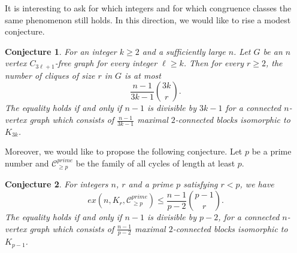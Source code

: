 \documentclass[a4paper,11pt]{article}
\newtheorem{conjecture}{Conjecture}
\def\C{\mathcal C}
\begin{document}
It is interesting to ask for which integers and for which congruence classes the same phenomenon still holds. 
In this direction, we would like to rise a modest conjecture.
\begin{conjecture}
    For an integer $k\geq 2$ and a sufficiently large $n$. Let $G$ be an $n$ vertex $C_{3\ell+1}$-free graph for every integer $\ell \geq k $. Then for every $r\geq 2$, the number of cliques of size $r$ in $G$ is at most
\[
 \frac{n-1}{3k-1}\binom{3k}{r}.
\]
The equality holds if and only if $n-1$ is divisible by $3k-1$ for a connected $n$-vertex graph which consists of $\frac{n-1}{3k-1}$ maximal $2$-connected blocks isomorphic to $K_{3k}$. 
\end{conjecture}
Moreover, we would like to propose the following conjecture. 
Let $p$ be a prime number and $\C_{\geq p}^{prime}$ be the family of all cycles of length at least $p$.
\begin{conjecture}
For integers $n$, $r$ and a prime $p$ satisfying $r<p$, we have  
\[
 ex(n,K_r,\C_{\geq p}^{prime})\leq \frac{n-1}{p-2}\binom{p-1}{r}.
\]
The equality holds if and only if $n-1$ is divisible by $p-2$, for a connected $n$-vertex graph which consists of $\frac{n-1}{p-2}$ maximal $2$-connected blocks isomorphic to $K_{p-1}$. 
\end{conjecture}
\end{document}
